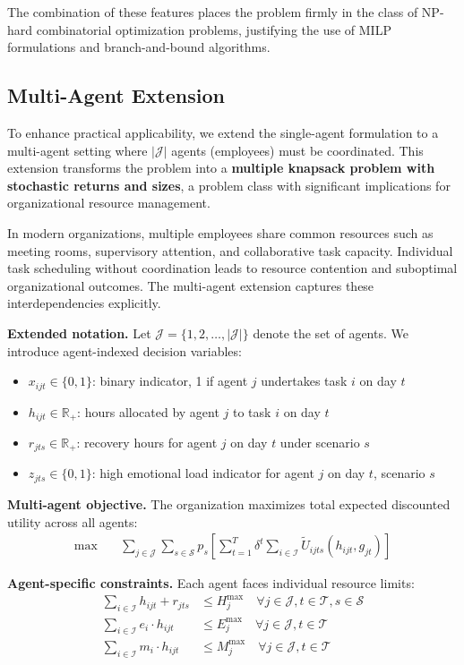 \documentclass[preprint,review,11pt]{elsarticle}
\newcommand{\R}{\mathbb{R}}
\begin{document}
The combination of these features places the problem firmly in the class of NP-hard combinatorial optimization problems, justifying the use of MILP formulations and branch-and-bound algorithms.

\subsection{Multi-Agent Extension}\label{sec:multiagent}

To enhance practical applicability, we extend the single-agent formulation to a multi-agent setting where $|\mathcal{J}|$ agents (employees) must be coordinated. This extension transforms the problem into a \textbf{multiple knapsack problem with stochastic returns and sizes}, a problem class with significant implications for organizational resource management.

In modern organizations, multiple employees share common resources such as meeting rooms, supervisory attention, and collaborative task capacity. Individual task scheduling without coordination leads to resource contention and suboptimal organizational outcomes. The multi-agent extension captures these interdependencies explicitly.

\textbf{Extended notation.} Let $\mathcal{J} = \{1, 2, \ldots, |\mathcal{J}|\}$ denote the set of agents. We introduce agent-indexed decision variables:
\begin{itemize}
    \item $x_{ijt} \in \{0,1\}$: binary indicator, 1 if agent $j$ undertakes task $i$ on day $t$
    \item $h_{ijt} \in \R_+$: hours allocated by agent $j$ to task $i$ on day $t$
    \item $r_{jts} \in \R_+$: recovery hours for agent $j$ on day $t$ under scenario $s$
    \item $z_{jts} \in \{0,1\}$: high emotional load indicator for agent $j$ on day $t$, scenario $s$
\end{itemize}

\textbf{Multi-agent objective.} The organization maximizes total expected discounted utility across all agents:
\begin{align}
\max \quad & \sum_{j \in \mathcal{J}} \sum_{s \in \mathcal{S}} p_s \left[ \sum_{t=1}^T \delta^t \sum_{i \in \mathcal{I}} \tilde{U}_{ijts}(h_{ijt}, g_{jt}) \right]
\end{align}

\textbf{Agent-specific constraints.} Each agent faces individual resource limits:
\begin{align}
\sum_{i \in \mathcal{I}} h_{ijt} + r_{jts} &\leq H_j^{\max} \quad \forall j \in \mathcal{J}, t \in \mathcal{T}, s \in \mathcal{S} \\
\sum_{i \in \mathcal{I}} e_i \cdot h_{ijt} &\leq E_j^{\max} \quad \forall j \in \mathcal{J}, t \in \mathcal{T} \\
\sum_{i \in \mathcal{I}} m_i \cdot h_{ijt} &\leq M_j^{\max} \quad \forall j \in \mathcal{J}, t \in \mathcal{T}
\end{align}
\end{document}
